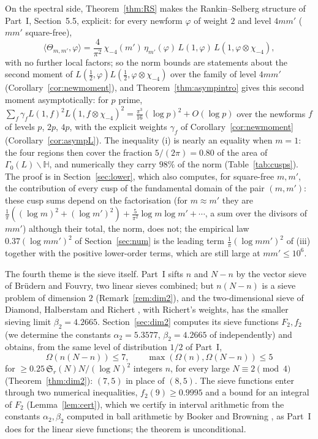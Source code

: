 ﻿\documentclass[11pt]{amsart}
\theoremstyle{remark}
\newcommand{\HH}{\mathbb{H}}
\newcommand{\Sg}{\mathfrak{S}}
\begin{document}
On the spectral side, Theorem~\ref{thm:RS} makes the Rankin--Selberg structure of Part~I, Section~5.5, explicit: for every newform $\varphi$ of weight $2$ and level $4mm'$ ($mm'$ square-free),
\[
\langle\Theta_{m,m'},\varphi\rangle=\frac4{\pi^2}\,\chi_{-4}(m')\,\eta_{m'}(\varphi)\,L(1,\varphi)\,L(1,\varphi\otimes\chi_{-4}),
\]
with no further local factors; so the norm bounds are statements about the second moment of $L(\frac12,\varphi)L(\frac12,\varphi\otimes\chi_{-4})$ over the family of level $4mm'$ (Corollary~\ref{cor:newmoment}), and Theorem~\ref{thm:asympintro} gives this second moment asymptotically: for $p$ prime, $\sum_f\gamma_fL(1,f)^2L(1,f\otimes\chi_{-4})^2=\frac{\pi^3}{16}(\log p)^2+O(\log p)$ over the newforms $f$ of levels $p$, $2p$, $4p$, with the explicit weights $\gamma_f$ of Corollary~\ref{cor:newmoment} (Corollary~\ref{cor:asympL}). The inequality (i) is nearly an equality when $m=1$: the four regions then cover the fraction $5/(2\pi)=0.80$ of the area of $\Gamma_0(L)\backslash\HH$, and numerically they carry $98\%$ of the norm (Table~\ref{tab:cusps}). The proof is in Section~\ref{sec:lower}, which also computes, for square-free $m,m'$, the contribution of every cusp of the fundamental domain of the pair $(m,m')$: these cusp sums depend on the factorisation (for $m\approx m'$ they are $\frac1\pi((\log m)^2+(\log m')^2)+\frac5{\pi^2}\log m\log m'+\cdots$, a sum over the divisors of $mm'$) although their total, the norm, does not; the empirical law $0.37(\log mm')^2$ of Section~\ref{sec:num} is the leading term $\frac1\pi(\log mm')^2$ of (iii) together with the positive lower-order terms, which are still large at $mm'\le10^6$.

The fourth theme is the sieve itself. Part~I sifts $n$ and $N-n$ by the vector sieve of Br\"udern and Fouvry, two linear sieves combined; but $n(N-n)$ is a sieve problem of dimension $2$ (Remark~\ref{rem:dim2}), and the two-dimensional sieve of Diamond, Halberstam and Richert \cite{DHR,DH}, with Richert's weights, has the smaller sieving limit $\beta_2=4.2665$. Section~\ref{sec:dim2} computes its sieve functions $F_2,f_2$ (we determine the constants $\alpha_2=5.3577$, $\beta_2=4.2665$ of \cite{DHR} independently) and obtains, from the same level of distribution $1/2$ of Part~I,
\[
\Omega(n(N-n))\le7,\qquad\max(\Omega(n),\Omega(N-n))\le5
\]
for $\ge0.25\,\Sg_r(N)N/(\log N)^2$ integers $n$, for every large $N\equiv2\pmod 4$ (Theorem~\ref{thm:dim2}): $(7,5)$ in place of $(8,5)$. The sieve functions enter through two numerical inequalities, $f_2(9)\ge0.9995$ and a bound for an integral of $F_2$ (Lemma~\ref{lem:cert}), which we certify in interval arithmetic from the constants $\alpha_2,\beta_2$ computed in ball arithmetic by Booker and Browning \cite{BB}, as Part~I does for the linear sieve functions; the theorem is unconditional.
\end{document}
